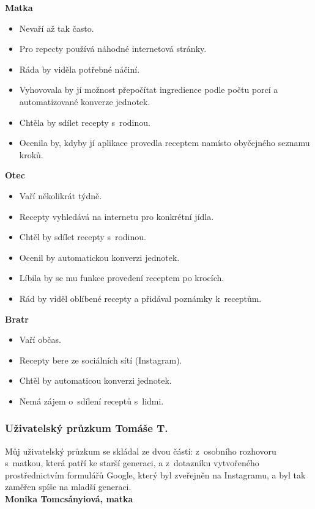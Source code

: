 \documentclass[a4paper, 11pt]{article}
\newcommand{\sss}[1]{\subsubsection{#1}} %
\begin{document}
	\noindent\textbf{Matka}
	\begin{itemize}
		\item Nevaří až tak často.
		\item Pro repecty používá náhodné internetová stránky.
		\item Ráda by viděla potřebné náčiní.
		\item Vyhovovala by jí možnost přepočítat ingredience podle počtu porcí a automatizované konverze jednotek.
		\item Chtěla by sdílet recepty s~rodinou.
		\item Ocenila by, kdyby jí aplikace provedla receptem namísto obyčejného seznamu kroků.
	\end{itemize}

	\noindent\textbf{Otec}
	\begin{itemize}
		\item Vaří několikrát týdně.
		\item Recepty vyhledává na internetu pro konkrétní jídla.
		\item Chtěl by sdílet recepty s~rodinou.
		\item Ocenil by automatickou konverzi jednotek.
		\item Líbila by se mu funkce provedení receptem po krocích.
		\item Rád by viděl oblíbené recepty a přidával poznámky k~receptům.
	\end{itemize}

	\noindent\textbf{Bratr}
	\begin{itemize}
		\item Vaří občas.
		\item Recepty bere ze sociálních sítí (Instagram).
		\item Chtěl by automaticou konverzi jednotek.
		\item Nemá zájem o~sdílení receptů s~lidmi.
	\end{itemize}

    \newpage

    \sss{Uživatelský průzkum Tomáše T.}
    Můj uživatelský průzkum se skládal ze dvou částí: z~osobního rozhovoru s~matkou, která patří ke starší 
    generaci, a z~dotazníku vytvořeného prostřednictvím formulářů Google, který byl zveřejněn na Instagramu, 
    a byl tak zaměřen spíše na mladší generaci.\\

    \noindent\textbf{Monika Tomcsányiová, matka}
\end{document}
